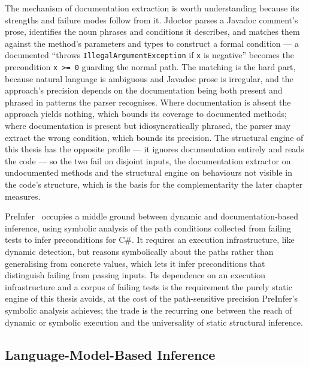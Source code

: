 The mechanism of documentation extraction is worth understanding because its
strengths and failure modes follow from it. Jdoctor parses a Javadoc comment's
prose, identifies the noun phrases and conditions it describes, and matches them
against the method's parameters and types to construct a formal condition --- a
documented ``throws \texttt{IllegalArgumentException} if \texttt{x} is negative''
becomes the precondition \texttt{x >= 0} guarding the normal path. The matching is
the hard part, because natural language is ambiguous and Javadoc prose is
irregular, and the approach's precision depends on the documentation being both
present and phrased in patterns the parser recognises. Where documentation is
absent the approach yields nothing, which bounds its coverage to documented
methods; where documentation is present but idiosyncratically phrased, the parser
may extract the wrong condition, which bounds its precision. The structural engine
of this thesis has the opposite profile --- it ignores documentation entirely and
reads the code --- so the two fail on disjoint inputs, the documentation extractor
on undocumented methods and the structural engine on behaviours not visible in the
code's structure, which is the basis for the complementarity the later chapter
measures.

PreInfer~\cite{preinfer2017} occupies a middle ground between dynamic and
documentation-based inference, using symbolic analysis of the path conditions
collected from failing tests to infer preconditions for C\#. It requires an
execution infrastructure, like dynamic detection, but reasons symbolically about
the paths rather than generalising from concrete values, which lets it infer
preconditions that distinguish failing from passing inputs. Its dependence on an
execution infrastructure and a corpus of failing tests is the requirement the
purely static engine of this thesis avoids, at the cost of the path-sensitive
precision PreInfer's symbolic analysis achieves; the trade is the recurring one
between the reach of dynamic or symbolic execution and the universality of static
structural inference.

\subsection{Language-Model-Based Inference}

